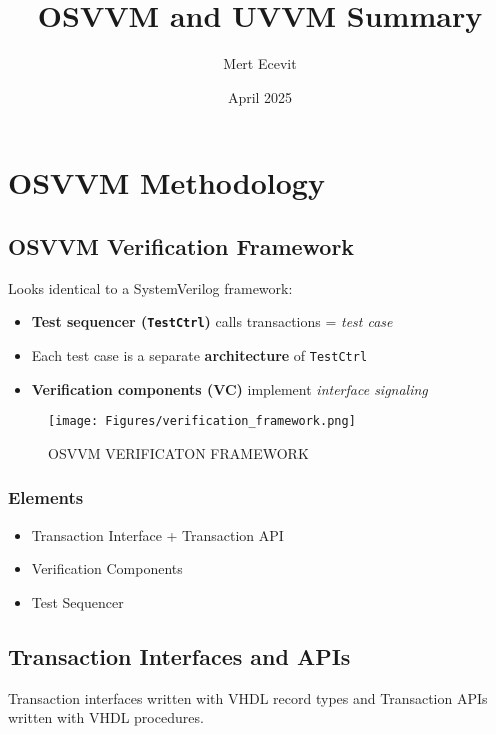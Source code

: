 \documentclass{article}
\title{OSVVM and UVVM Summary}
\author{Mert Ecevit}
\date{April 2025}
\begin{document}
\maketitle

\newpage

\section*{OSVVM Methodology}
\subsection{OSVVM Verification Framework}

Looks identical to a SystemVerilog framework:

\begin{itemize}
  \item \textbf{Test sequencer (\texttt{TestCtrl})} calls transactions = \textit{test case}
  \item Each test case is a separate \textbf{architecture} of \texttt{TestCtrl}
  \item \textbf{Verification components (VC)} implement \textit{interface signaling}
\end{itemize}

\begin{figure}
    \centering
    \texttt{[image: Figures/verification\_framework.png]}
    \caption{OSVVM VERIFICATON FRAMEWORK}
    \label{fig:enter-label}
\end{figure}

\subsubsection{Elements}

\begin{itemize}
    \item Transaction Interface + Transaction API
    \item Verification Components
    \item Test Sequencer
\end{itemize}

\subsection{Transaction Interfaces and APIs}

Transaction interfaces written with VHDL record types and Transaction APIs written with VHDL procedures. 
\end{document}

